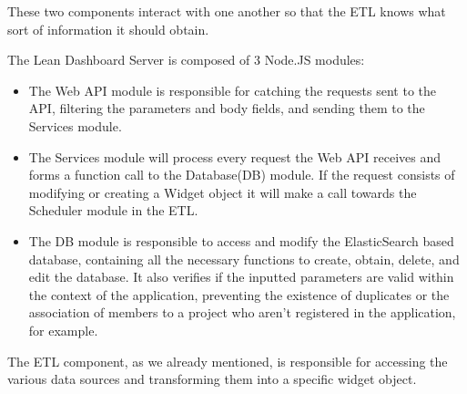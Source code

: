 \documentclass[a4paper,twoside,10pt]{report}
\begin{document}
These two components interact with one another so that the ETL knows what sort of information it should obtain.

The Lean Dashboard Server is composed of 3 Node.JS\cite{NODE} modules:
\begin{itemize}
 \item The Web API module is responsible for catching the requests sent to the API, filtering the parameters and body fields, and sending them to the Services module.
 \item The Services module will process every request the Web API receives and forms a function call to the Database(DB) module. If the request consists of modifying or creating a Widget object it will make a call towards the Scheduler module in the ETL.
 \item The DB module is responsible to access and modify the ElasticSearch based database, containing all the necessary functions to create, obtain, delete, and edit the database. It also verifies if the inputted parameters are valid within the context of the application, preventing the existence of duplicates or the association of members to a project who aren't registered in the application, for example.
\end{itemize}
\newpage
The ETL component, as we already mentioned, is responsible for accessing the various data sources and transforming them into a specific widget object.
\end{document}
